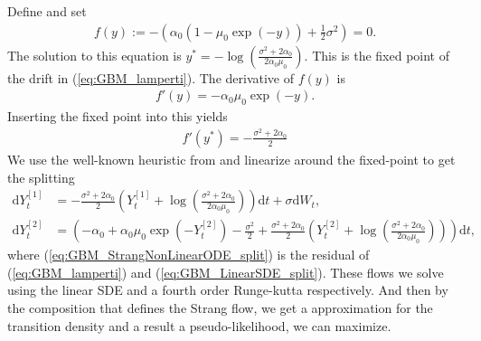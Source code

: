 Define and set
\begin{align}
    f(y) := -\left(\alpha_0\left(1 - \mu_0\exp(-y)\right) + \frac{1}{2}\sigma^2\right) = 0.
\end{align}
The solution to this equation is $y^* = -\log\left(\frac{\sigma^2 + 2\alpha_0}{2\alpha_0\mu_0}\right)$. This is
the fixed point of the drift in (\ref{eq:GBM_lamperti}). The derivative of $f(y)$ is 
\begin{align}
    f'(y) = -\alpha_0\mu_0\exp(-y).
\end{align}
Inserting the fixed point into this yields
\begin{align}
    f'(y^*) = -\frac{\sigma^2 + 2\alpha_0}{2}
\end{align}
We use the well-known heuristic from \cite{SplittingSchemes} and linearize around the fixed-point to get the splitting
\begin{align}
    \mathrm{d}Y_t^{[1]} &= - \frac{\sigma^2 + 2\alpha_0}{2}\left(Y_t^{[1]} + \log\left(\frac{\sigma^2 + 2\alpha_0}{2\alpha_0 \mu_0}\right)\right)\mathrm{d}t + \sigma \mathrm{d}W_t, \label{eq:GBM_LinearSDE_split}\\
    \mathrm{d}Y_t^{[2]} &= \left(-\alpha_0 + \alpha_0\mu_0\exp(-Y_t^{[2]}) - \frac{\sigma^2}{2} + \frac{\sigma^2+2\alpha_0}{2}\left(Y_t^{[2]} + \log\left(\frac{\sigma^2+2\alpha_0}{2\alpha_0\mu_0}\right)\right)\right)\mathrm{d}t, \label{eq:GBM_StrangNonLinearODE_split}
\end{align}
where (\ref{eq:GBM_StrangNonLinearODE_split}) is the residual of (\ref{eq:GBM_lamperti}) and (\ref{eq:GBM_LinearSDE_split}).
These flows we solve using the linear SDE and a fourth order Runge-kutta respectively. And then by the composition that defines the Strang flow, we get a approximation for the transition density and a result a pseudo-likelihood, we can maximize.

